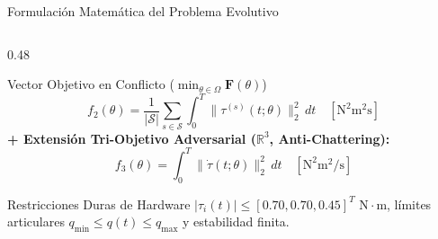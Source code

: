\documentclass[aspectratio=169,9pt]{beamer}
\begin{document}
\begin{frame}{Formulación Matemática del Problema Evolutivo}
\begin{columns}[T,onlytextwidth]
\begin{column}{0.48\textwidth}
\begin{block}{\footnotesize Vector Objetivo en Conflicto ($\min_{\theta \in \Omega} \mathbf{F}(\theta)$)}
\[        \]
        \vspace{-0.22cm}
        \[
            f_2(\theta) = \frac{1}{|\mathcal{S}|}\sum_{s \in \mathcal{S}} \int_0^T \|\tau^{(s)}(t;\theta)\|_2^2\,dt \quad [\text{N}^2\text{m}^2\text{s}]
        \]
        \vspace{-0.1cm}
        \textbf{+ Extensión Tri-Objetivo Adversarial ($\mathbb{R}^3$, Anti-Chattering):}
        \vspace{-0.15cm}
        \[
            f_3(\theta) = \int_0^T \|\dot{\tau}(t;\theta)\|_2^2\,dt \quad [\text{N}^2\text{m}^2/\text{s}]
        \]
        \vspace{-0.2cm}
    \end{block}
    \vspace{-0.12cm}
    \begin{alertblock}{\footnotesize Restricciones Duras de Hardware}
        \scriptsize
        $|\tau_i(t)| \le [0.70, 0.70, 0.45]^T\text{ N}\cdot\text{m}$, límites articulares $q_{\min} \le q(t) \le q_{\max}$ y estabilidad finita.
    \end{alertblock}
\end{column}
\end{columns}
\end{frame}
\end{document}
